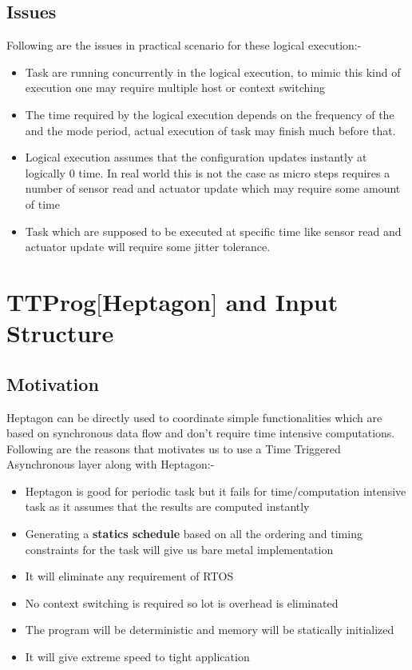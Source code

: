 \documentclass[16pt]{report}
\begin{document}
\section{Issues}
Following are the issues in practical scenario for these logical execution:-
\begin{itemize}
    \item Task are running concurrently in the logical execution, to mimic this kind of execution one may require multiple host or context switching
    \item The time required by the logical execution depends on the frequency of the and the mode period, actual execution of task may finish much before that.
    \item Logical execution assumes that the configuration updates instantly at logically 0 time. In real world this is not the case as micro steps requires a number of sensor read and actuator update which may require some amount of time 
    \item Task which are supposed to be executed at specific time like sensor read and actuator update will require some jitter tolerance.
\end{itemize}


\chapter{TTProg${[}$Heptagon${]} $ and Input Structure}



\section{Motivation}
Heptagon can be directly used to coordinate simple functionalities which are based on synchronous data flow and  don't require time intensive computations. Following are the reasons that motivates us to use a Time Triggered Asynchronous layer along with Heptagon:-
\begin{itemize}
    \item Heptagon is good for periodic task but it fails for time/computation intensive task as it assumes that the results are computed instantly
    \item Generating a \textbf{statics schedule} based on all the ordering and timing constraints for the task will give us bare metal implementation
    \item It will eliminate any requirement of RTOS
    \item No context switching is required so lot is overhead is eliminated
    \item The program will be deterministic and memory will be statically initialized
    \item It will give extreme speed to tight application
\end{itemize}
\end{document}
